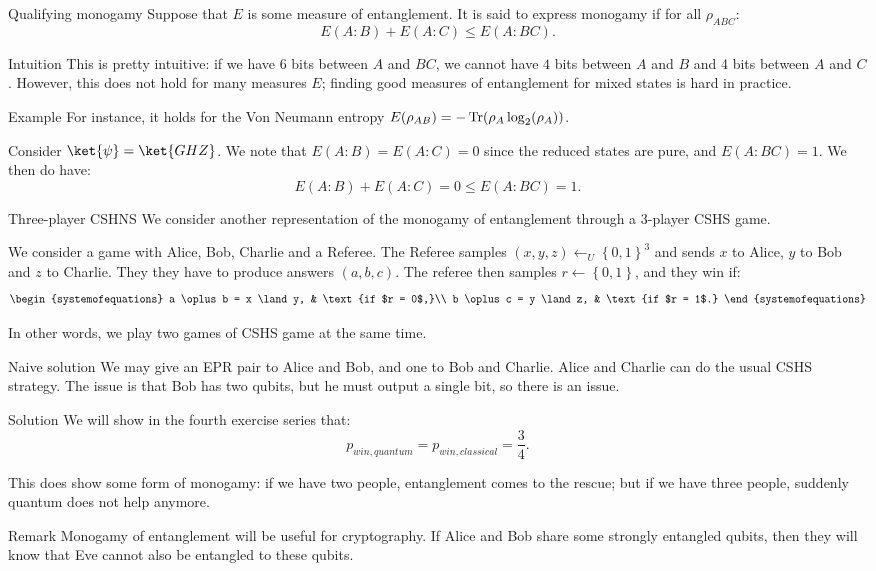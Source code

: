 \documentclass[a4paper]{article}
\begin{document}
\begin{parag}{Qualifying monogamy}
    Suppose that $E$ is some measure of entanglement. It is said to express monogamy if for all $\rho_{ABC}$:
    \[E\left(A: B\right) + E\left(A: C\right) \leq E\left(A: BC\right).\]

    \begin{subparag}{Intuition}
        This is pretty intuitive: if we have 6 bits between $A$ and $BC$, we cannot have $4$ bits between $A$ and $B$ and 4 bits between $A$ and $C$. However, this does not hold for many measures $E$; finding good measures of entanglement for mixed states is hard in practice.
    \end{subparag}

    \begin{subparag}{Example}
        For instance, it holds for the Von Neumann entropy $E\left(\rho_{AB}\right) = -\Tr\left(\rho_A \log_2\left(\rho_A\right)\right)$.

        Consider $\ket{\psi} = \ket{GHZ}$. We note that $E\left(A: B\right) = E\left(A: C\right) = 0$ since the reduced states are pure, and $E\left(A: BC\right) = 1$. We then do have: 
        \[E\left(A: B\right) + E\left(A: C\right) = 0 \leq E\left(A : BC\right) = 1.\]
    \end{subparag}
\end{parag}

\begin{parag}{Three-player CSHNS}
    We consider another representation of the monogamy of entanglement through a 3-player CSHS game.

    We consider a game with Alice, Bob, Charlie and a Referee. The Referee samples $\left(x, y, z\right) \leftarrow_U \left\{0, 1\right\}^3$ and sends $x$ to Alice, $y$ to Bob and $z$ to Charlie. They they have to produce answers $\left(a, b, c\right)$. The referee then samples $r \leftarrow \left\{0, 1\right\}$, and they win if: 
    \[\begin{systemofequations} a \oplus b =  x \land y, & \text{if $r = 0$,}\\ b \oplus c = y \land z, & \text{if $r = 1$.} \end{systemofequations}\]

    In other words, we play two games of CSHS game at the same time. 

    \begin{subparag}{Naive solution}
        We may give an EPR pair to Alice and Bob, and one to Bob and Charlie. Alice and Charlie can do the usual CSHS strategy. The issue is that Bob has two qubits, but he must output a single bit, so there is an issue.
    \end{subparag}
    
    \begin{subparag}{Solution}
        We will show in the fourth exercise series that:
        \[p_{win, quantum} = p_{win, classical} = \frac{3}{4}.\]

        This does show some form of monogamy: if we have two people, entanglement comes to the rescue; but if we have three people, suddenly quantum does not help anymore.
    \end{subparag}
\end{parag}

\begin{parag}{Remark}
    Monogamy of entanglement will be useful for cryptography. If Alice and Bob share some strongly entangled qubits, then they will know that Eve cannot also be entangled to these qubits.
\end{parag}
\end{document}
